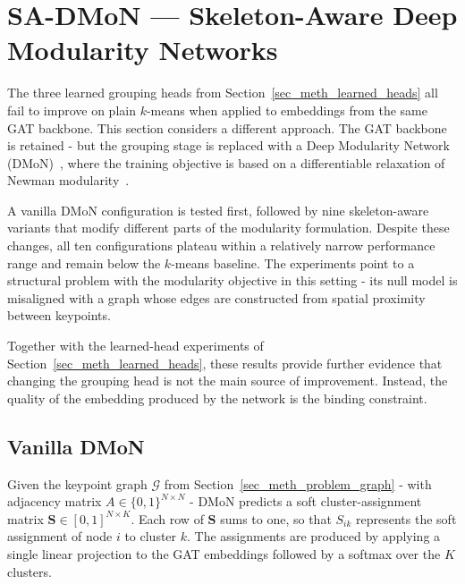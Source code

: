 \section{SA-DMoN --- Skeleton-Aware Deep Modularity Networks}
\label{sec_meth_sadmon}

The three learned grouping heads from
Section~\ref{sec_meth_learned_heads} all fail to improve on plain
$k$-means when applied to embeddings from the same GAT backbone.
This section considers a different approach.
The GAT backbone is retained -
but the grouping stage is replaced with a Deep Modularity Network
(DMoN)~\cite{tsitsulin2023dmon},
where the training objective is based on a differentiable relaxation
of Newman modularity~\cite{newman2006modularity}.

A vanilla DMoN configuration is tested first,
followed by nine skeleton-aware variants
that modify different parts of the modularity formulation.
Despite these changes, all ten configurations
plateau within a relatively narrow performance range
and remain below the $k$-means baseline.
The experiments point to a structural problem
with the modularity objective in this setting -
its null model is misaligned with a graph
whose edges are constructed from spatial proximity
between keypoints.

Together with the learned-head experiments of
Section~\ref{sec_meth_learned_heads},
these results provide further evidence
that changing the grouping head is not the main source of improvement.
Instead, the quality of the embedding produced by the network
is the binding constraint.

\subsection{Vanilla DMoN}
\label{sec_meth_dmon_pose}

Given the keypoint graph $\mathcal{G}$ from
Section~\ref{sec_meth_problem_graph} - with adjacency matrix
$A \in \{0,1\}^{N \times N}$ -
DMoN predicts a soft cluster-assignment matrix
$\mathbf{S} \in [0,1]^{N \times K}$.
Each row of $\mathbf{S}$ sums to one,
so that $S_{ik}$ represents the soft assignment
of node $i$ to cluster $k$.
The assignments are produced by applying a single linear projection
to the GAT embeddings followed by a softmax over the $K$ clusters.

